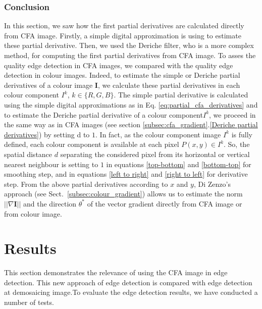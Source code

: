 \documentclass[twoside]{article}
\begin{document}
\subsubsection{Conclusion}
\label{Conclusion}
In this section, we saw how the first partial derivatives are calculated directly from CFA image. Firstly, a simple digital approximation is using to estimate these partial derivative. Then, we used the Deriche filter, who is a more complex method, for computing the first partial derivatives from CFA image. To asses the quality edge detection in CFA images, we compared with the quality edge detection in colour images. Indeed, to estimate the simple or  Deriche partial derivatives of a colour image $\textbf{I}$, we calculate these partial derivatives in each colour component $I^k$, $k\in\{R,G,B\}$. The simple partial derivative is calculated using the simple digital approximations as in Eq. \eqref{eq:partial_cfa_derivatives} and to estimate the Deriche partial derivative of a colour component$I^k$, we proceed in the same way as in CFA images (see section \ref{subsec:cfa_gradient}.\ref{Deriche partial derivatives}) by setting d to $1$. In fact, as the colour component image $I^k$ is fully defined, each colour component is available at each pixel $P(x,y) \in I^k$. So, the spatial distance $d$ separating the considered pixel from its horizontal or vertical nearest neighbour is setting to $1$ in equations \eqref{top-bottom} and \eqref{bottom-top} for smoothing step, and in equations \eqref{left to right} and \eqref{right to left} for derivative step. From the above partial derivatives according to $x$ and $y$, Di Zenzo's approach (see Sect.~\ref{subsec:colour_gradient}) allows us to estimate the norm $||\nabla \mathbf{I}||$ and the direction $\theta^{*}$ of the vector gradient directly from CFA image or from colour image.    































	
\section{Results}
\label{sec:Results}
This section demonstrates the relevance of using the CFA image in edge detection. This new approach of edge detection is compared with edge detection at demosaicing image.To evaluate the edge detection results, we have conducted a number of tests.   
\end{document}
